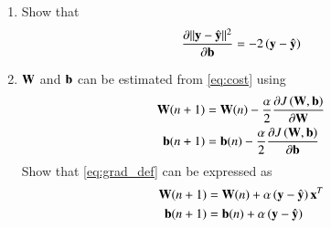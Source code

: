 \documentclass[journal,12pt,twocolumn]{IEEEtran}
\renewcommand\thesection{\arabic{section}}
\begin{document}
\begin{enumerate}[label=\thesection.\arabic*
,ref=\thesection.\theenumi]
\begin{align}
\frac{\partial \norm{\mbf{W}\mbf{x}+\vec{b}}^2} {\partial\vec{b}}  = 2\brak{\mbf{W}\mbf{x}+\vec{b}}
\end{align}
\item Show that 
\begin{align}
\frac{\partial \lVert\mathbf{y}-\hat{\mathbf{y}}\rVert^2} {\partial\mathbf{b}} = -2\left(\mathbf{y}-\hat{\mathbf{y}}\right)
\end{align}
\item $\mathbf{W}$ and $\mathbf{b}$ can be estimated from \eqref{eq:cost} using
\begin{align}
\label{eq:grad_def}
\mathbf{W}(n+1) &= \mathbf{W}(n) - \frac{\alpha}{2}\frac{\partial J\left(\mathbf{W},\mathbf{b}\right) }{\partial\mathbf{W}}
\\
\mathbf{b}(n+1) &= \mathbf{b}(n) - \frac{\alpha}{2}\frac{\partial J\left(\mathbf{W},\mathbf{b}\right)}{\partial\mathbf{b}}
\end{align}
Show that \eqref{eq:grad_def} can be expressed as
\begin{align}
\mathbf{W}(n+1) &= \mathbf{W}(n) + \alpha\left(\mathbf{y}-\hat{\mathbf{y}}\right)\mathbf{x}^T
\\
\mathbf{b}(n+1) &= \mathbf{b}(n) + \alpha\left(\mathbf{y}-\hat{\mathbf{y}}\right)
\end{align}

\end{enumerate}
\end{document}
